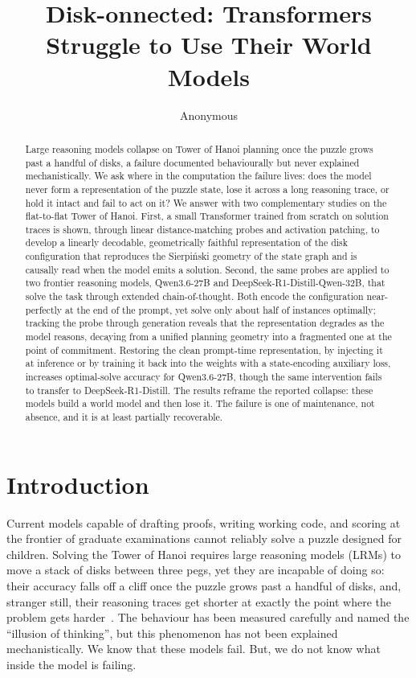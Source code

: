 \documentclass{article} %
\title{Disk-onnected: Transformers Struggle to Use Their World Models}
\author{Anonymous}
\begin{document}
\ifcolmsubmission
\linenumbers
\fi

\maketitle

\begin{abstract}
Large reasoning models collapse on Tower of Hanoi planning once the puzzle grows past a handful of disks, a failure documented behaviourally but never explained mechanistically. We ask where in the computation the failure lives: does the model never form a representation of the puzzle state, lose it across a long reasoning trace, or hold it intact and fail to act on it? We answer with two complementary studies on the flat-to-flat Tower of Hanoi. First, a small Transformer trained from scratch on solution traces is shown, through linear distance-matching probes and activation patching, to develop a linearly decodable, geometrically faithful representation of the disk configuration that reproduces the Sierpi\'nski geometry of the state graph and is causally read when the model emits a solution. Second, the same probes are applied to two frontier reasoning models, Qwen3.6-27B and DeepSeek-R1-Distill-Qwen-32B, that solve the task through extended chain-of-thought. Both encode the configuration near-perfectly at the end of the prompt, yet solve only about half of instances optimally; tracking the probe through generation reveals that the representation degrades as the model reasons, decaying from a unified planning geometry into a fragmented one at the point of commitment. Restoring the clean prompt-time representation, by injecting it at inference or by training it back into the weights with a state-encoding auxiliary loss, increases optimal-solve accuracy for Qwen3.6-27B, though the same intervention fails to transfer to DeepSeek-R1-Distill. The results reframe the reported collapse: these models build a world model and then lose it. The failure is one of maintenance, not absence, and it is at least partially recoverable.
\end{abstract}

\section{Introduction}
\label{sec:introduction}

Current models capable of drafting proofs, writing working code, and scoring at the frontier of graduate examinations cannot reliably solve a puzzle designed for children. Solving the Tower of Hanoi requires large reasoning models (LRMs) to move a stack of disks between three pegs, yet they are incapable of doing so: their accuracy falls off a cliff once the puzzle grows past a handful of disks, and, stranger still, their reasoning traces get shorter at exactly the point where the problem gets harder~\citep{shojaee2025illusion}. The behaviour has been measured carefully and named the \enquote{illusion of thinking}, but this phenomenon has not been explained mechanistically. We know that these models fail. But, we do not know what inside the model is failing.
\end{document}
